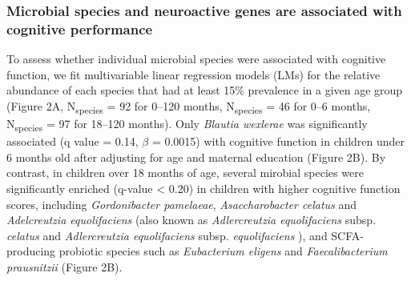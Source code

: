 \documentclass{article}
\begin{document}
\subsubsection*{Microbial species and neuroactive genes are associated with cognitive performance}

To assess whether individual microbial species were associated with
cognitive function, we fit multivariable linear regression models (LMs)
\cite{mallickMultivariableAssociationDiscovery2021}
for the relative abundance of each species that had at least 15\%
prevalence in a given age group (Figure 2A, N\textsubscript{species} = 92 for 0--120 months, 
N\textsubscript{species} = 46 for 0--6 months, N\textsubscript{species} = 97 for 18--120 months).
Only \emph{Blautia wexlerae} was significantly associated (q value = 0.14, $\beta$ = 0.0015) with
cognitive function in children under 6 months old after adjusting for
age and maternal education (Figure 2B).
By contrast, in children over 18 months of age,
several mirobial species were significantly enriched (q-value
\textless{} 0.20) in children with higher cognitive function scores,
including \emph{Gordonibacter pamelaeae},
\emph{Asaccharobacter celatus} and \emph{Adelcreutzia equolifaciens}
(also known as \textit{Adlercreutzia equolifaciens} subsp. \textit{celatus}
and \textit{Adlercreutzia equolifaciens} subsp. \textit{equolifaciens} \cite{maruoAdlercreutziaEquolifaciensGen2008}),
and SCFA-producing probiotic
species such as \emph{Eubacterium eligens} and \emph{Faecalibacterium
prausnitzii}
\cite{ghoshMediterraneanDietIntervention2020}
(Figure 2B).
\end{document}
